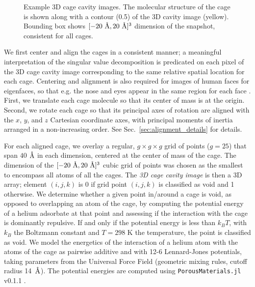\documentclass[journal=jacsat,manuscript=article,layout=traditional]{achemso}
\newcommand{\angstrom}{\mbox{\normalfont\AA}}
\begin{document}
\begin{figure}
	\caption{Example 3D cage cavity images. The molecular structure of the cage is shown along with a contour (0.5) of the 3D cavity image (yellow). Bounding box shows $[-20 \text{ } \angstrom, 20 \text{ } \angstrom]^3$ dimension of the snapshot, consistent for all cages.
	} \label{fig:raw3Dimages}
\end{figure}

We first center and align the cages in a consistent manner; a meaningful interpretation of the singular value decomposition is predicated on each pixel of the 3D cage cavity image corresponding to the same relative spatial location for each cage. Centering and alignment is also required for images of human faces for eigenfaces, so that e.g. the nose and eyes appear in the same region for each face \cite{zhang2008eigenfaces}. First, we translate each cage molecule so that its center of mass is at the origin. Second, we rotate each cage so that its principal axes of rotation are aligned with the $x$, $y$, and $z$ Cartesian coordinate axes, with principal moments of inertia arranged in a non-increasing order. See Sec.~\ref{sec:alignment_details} for details.

For each aligned cage, we overlay a regular, $g\times g\times g$ grid of points ($g=25$) that span $40$ $\angstrom$ in each dimension, centered at the center of mass of the cage. The dimension of the $[-20 \text{ } \angstrom, 20 \text{ } \angstrom]^3$ cubic grid of points was chosen as the smallest to encompass all atoms of all the cages. The \emph{3D cage cavity image} is then a 3D array; element $(i, j, k)$ is 0 if grid point $(i, j, k)$ is classified as void and 1 otherwise. We determine whether a given point in/around a cage is void, as opposed to overlapping an atom of the cage, by computing the potential energy of a helium adsorbate at that point and assessing if the interaction with the cage is dominantly repulsive. If and only if the potential energy is less than $k_BT$, with $k_B$ the Boltzmann constant and $T=298$ K the temperature, the point is classified as void. We model the energetics of the interaction of a helium atom with the atoms of the cage as pairwise additive and with 12-6 Lennard-Jones potentials, taking parameters from the Universal Force Field \cite{rappe1992uff} (geometric mixing rules, cutoff radius 14~$\angstrom$). The potential energies are computed using \texttt{PorousMaterials.jl} v0.1.1 \cite{PorousMaterialsJL}.
\end{document}
